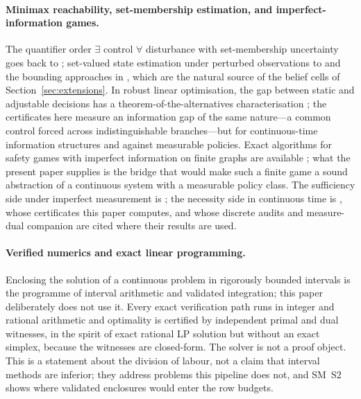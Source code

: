 \paragraph{Minimax reachability, set-membership estimation, and imperfect-information games.}
The quantifier order $\exists$ control $\forall$ disturbance with set-membership uncertainty goes back to \cite{BertsekasRhodes1971}; set-valued state estimation under perturbed observations to \cite{Witsenhausen1968} and the bounding approaches in \cite{Milanese1996}, which are the natural source of the belief cells of Section~\ref{sec:extensions}. In robust linear optimisation, the gap between static and adjustable decisions has a theorem-of-the-alternatives characterisation \cite{WeiZhang2024}; the certificates here measure an information gap of the same nature---a common control forced across indistinguishable branches---but for continuous-time information structures and against measurable policies. Exact algorithms for safety games with imperfect information on finite graphs are available \cite{Chatterjee2007}; what the present paper supplies is the bridge that would make such a finite game a sound abstraction of a continuous system with a measurable policy class. The sufficiency side under imperfect measurement is \cite{Veliov1993}; the necessity side in continuous time is \cite{Abaee2026calc}, whose certificates this paper computes, and whose discrete audits \cite{Abaee2026worked} and measure-dual companion \cite{Abaee2026minimax} are cited where their results are used.

\paragraph{Verified numerics and exact linear programming.}
Enclosing the solution of a continuous problem in rigorously bounded intervals is the programme of interval arithmetic and validated integration; this paper deliberately does not use it. Every exact verification path runs in integer and rational arithmetic and optimality is certified by independent primal and dual witnesses, in the spirit of exact rational LP solution \cite{Applegate2007} but without an exact simplex, because the witnesses are closed-form. The solver is not a proof object. This is a statement about the division of labour, not a claim that interval methods are inferior; they address problems this pipeline does not, and SM~S2 shows where validated enclosures would enter the row budgets.

